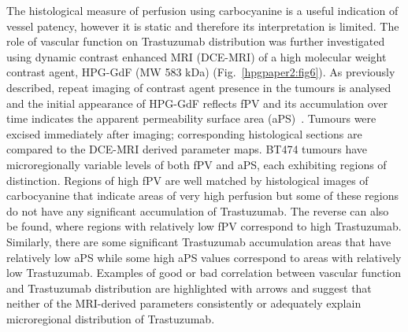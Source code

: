 The histological measure of perfusion using carbocyanine is a useful indication of vessel patency, however it is static and therefore its interpretation is limited.
The role of vascular function on Trastuzumab distribution was further investigated using dynamic contrast enhanced MRI (DCE-MRI) of a high molecular weight contrast agent, \acs{HPG-GdF} (MW 583 kDa) (Fig.~\ref{hpgpaper2:fig6}).
As previously described, repeat imaging of contrast agent presence in the tumours is analysed and the initial appearance of \acs{HPG-GdF} reflects \acs{fPV} and its accumulation over time indicates the apparent permeability surface area (aPS)~\cite{Baker:2015cob}.
Tumours were excised immediately after imaging; corresponding histological sections are compared to the DCE-MRI derived parameter maps.
\acs{BT474} tumours have microregionally variable levels of both \acs{fPV} and \acs{aPS}, each exhibiting regions of distinction.
Regions of high \acs{fPV} are well matched by histological images of carbocyanine that indicate areas of very high perfusion but some of these regions do not have any significant accumulation of Trastuzumab.
The reverse can also be found, where regions with relatively low \acs{fPV} correspond to high Trastuzumab.
Similarly, there are some significant Trastuzumab accumulation areas that have relatively low \acs{aPS} while some high \acs{aPS} values correspond to areas with relatively low Trastuzumab.
Examples of good or bad correlation between vascular function and Trastuzumab distribution are highlighted with arrows and suggest that neither of the MRI-derived parameters consistently or adequately explain microregional distribution of Trastuzumab.

